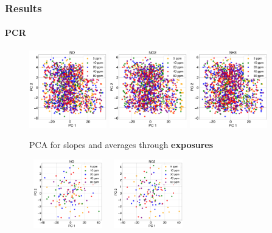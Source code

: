 \documentclass{beamer}
\begin{document}
\begin{frame}
	\frametitle{Results}
	\framesubtitle{PCR}
		
		\begin{figure}[h]
			\includegraphics[width=0.30\textwidth]{../../figures/pcaNO.png}
			\hfill
			\includegraphics[width=0.30\textwidth]{../../figures/pcaNO2.png}
			\hfill
			\includegraphics[width=0.30\textwidth]{../../figures/pcaNH3.png}
			\caption{PCA for slopes and averages through \textbf{exposures}}
		\end{figure}
		\begin{figure}[h]
			\includegraphics[width=0.30\textwidth, height = 3cm, keepaspectratio]{../../figures/pcaNO-avg-feat.png}
			\hfill
			\includegraphics[width=0.30\textwidth, height = 3cm, keepaspectratio]{../../figures/pcaNO2-avg-feat.png}

\end{figure}
\end{frame}
\end{document}
